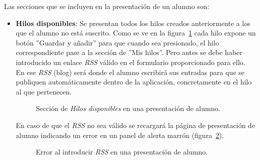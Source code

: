 \documentclass[a4paper, 12pt]{book}
\begin{document}
Las secciones que se incluyen en la presentaci\'on de un alumno son:

\begin{itemize}
  \item {\bfseries Hilos disponibles}: Se presentan todos los hilos creados anteriormente a los que el alumno no est\'a suscrito. Como se ve en la 
  figura~\ref{figura:alumno1} cada hilo expone un bot\'on ''Guardar y a\~nadir'' para que cuando sea presionado, el hilo correspondiente pase a la 
  secci\'on de ''Mis hilos''. Pero antes se debe haber introducido un enlace \textit{RSS} v\'alido en el formulario proporcionado para ello. En ese 
  \textit{RSS} (blog) ser\'a donde el alumno escribir\'a sus entradas para que se publiquen autom\'aticamente dentro de la aplicaci\'on, concretamente
  en el hilo al que pertenecen.
  \begin{figure}[htbp] 
    \centering
    \caption{Secci\'on de \textit{Hilos disponibles} en una presentaci\'on de alumno.}
    \label{figura:alumno1}
  \end{figure}
  
  En caso de que el \textit{RSS} no sea v\'alido se recargar\'a la p\'agina de presentaci\'on de alumno indicando un error en un panel de alerta marr\'on 
  (figura~\ref{figura:alumno2}).
  \begin{figure}[htbp] 
    \centering
    \caption{Error al introducir \textit{RSS} en una presentaci\'on de alumno.}
    \label{figura:alumno2}
  \end{figure}
  

\end{itemize}
\end{document}
